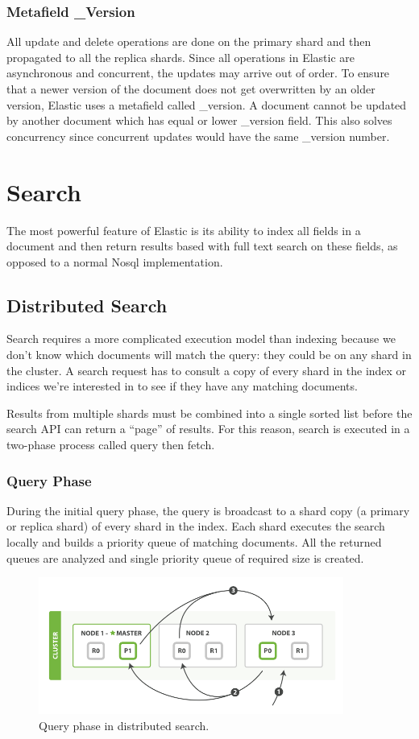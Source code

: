 \documentclass[12pt]{article}
\begin{document}
			\subsubsection{Metafield \_Version}
				All update and delete operations are done on the primary shard and then propagated to all the replica shards. Since all operations in Elastic are asynchronous and concurrent, the updates may arrive out of order. To ensure that a newer version of the document does not get overwritten by an older version, Elastic uses a metafield called \_version. A document cannot be updated by another document which has equal or lower \_version field. This also solves concurrency since concurrent updates would have the same \_version number.

	\section{Search}
		The most powerful feature of Elastic is its ability to index all fields in a document and then return results based with full text search on these fields, as opposed to a normal No\ac{sql} implementation.

		\subsection{Distributed Search}
			Search requires a more complicated execution model than indexing because we don’t know which
			documents will match the query: they could be on any shard in the cluster. A search
			request has to consult a copy of every shard in the index or indices we’re interested in
			to see if they have any matching documents.
			
			Results from multiple shards must be combined into a single sorted list before the search API can return a	“page” of results. For this reason, search is executed in a two-phase process called query then fetch.

			\subsubsection{Query Phase}
			During the initial query phase, the query is broadcast to a shard copy (a primary or
			replica shard) of every shard in the index. Each shard executes the search locally and
			builds a priority queue of matching documents. All the returned queues are analyzed and single priority queue of required size is created.
				\begin{figure}[ht]
					\centering\includegraphics[width=10cm]{images/query_phase}
					\caption{Query phase in distributed search.}
				\end{figure}
\end{document}
